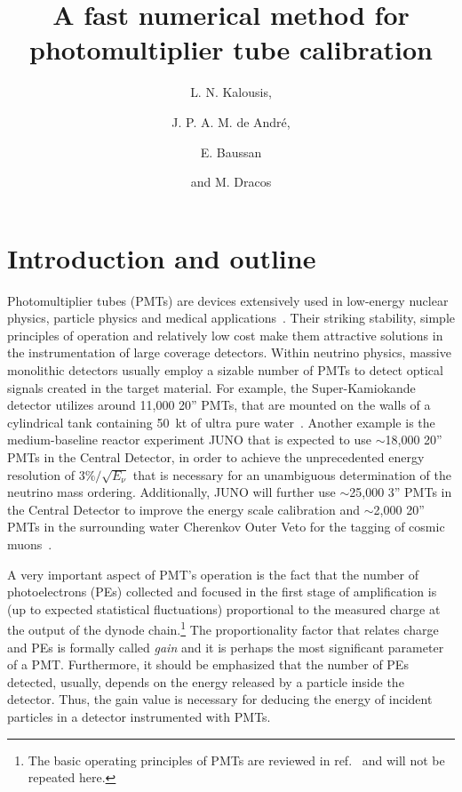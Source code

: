 \documentclass[a4paper,11pt]{article}
\title{\boldmath A fast numerical method for photomultiplier tube calibration}
\author[a,1]{L. N. Kalousis,\note{Corresponding author.}}
\author[a]{J. P. A. M. de Andr\'e,}
\author[a]{E. Baussan}
\author[a]{and M. Dracos}
\affiliation[a]{IPHC, Universit\'e de Strasbourg, CNRS/IN2P3, F-67037 Strasbourg, France}
\begin{document}
\maketitle
\flushbottom

\section{Introduction and outline}
\label{sec:intro}
%

Photomultiplier tubes (PMTs) are devices extensively used in low-energy nuclear physics, particle physics and medical applications~\cite{Leo}. 
Their striking stability, simple principles of operation and relatively low cost make them attractive solutions in the instrumentation of large coverage detectors. 
Within neutrino physics, massive monolithic detectors usually employ a sizable number of PMTs to detect optical signals created in the target material. 
For example, the Super-Kamiokande detector utilizes around 11,000 20'' PMTs, that are mounted on the walls of a cylindrical tank containing 50~kt of ultra pure water~\cite{SK}. 
Another example is the medium-baseline reactor experiment JUNO that is expected to use $\sim$18,000 20'' PMTs in the Central Detector,
in order to achieve the unprecedented energy resolution of $3\%/ \sqrt{E_\nu}$ that is necessary for an unambiguous determination of the neutrino mass ordering. 
Additionally, JUNO will further use $\sim$25,000 3'' PMTs in the Central Detector to improve the energy scale calibration and 
$\sim$2,000 20'' PMTs in the surrounding water Cherenkov Outer Veto for the tagging of cosmic muons~\cite{JUNO1,JUNO2,JUNO3}. 

A very important aspect of PMT's operation is the fact that the number of photoelectrons (PEs) collected and focused in the first stage of amplification is 
(up to expected statistical fluctuations) proportional to the measured charge at the output of the dynode chain.\footnote{%
The basic operating principles of PMTs are reviewed in ref.~\cite{Leo} and will not be repeated here.}
The proportionality factor that relates charge and PEs is formally called \emph{gain} and it is perhaps the most significant parameter of a PMT. 
Furthermore, it should be emphasized that the number of PEs detected, usually, depends on the energy released by a particle inside the detector. 
Thus, the gain value is necessary for deducing the energy of incident particles in a detector instrumented with PMTs.   
\end{document}
